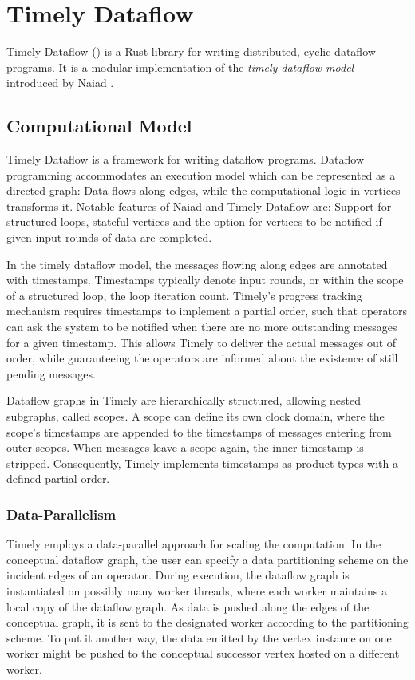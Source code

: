 \chapter{Timely Dataflow}\label{ch:background}

Timely Dataflow \cite{timely} () is a Rust library for writing distributed,
cyclic dataflow programs. It is a modular implementation of the \emph{timely dataflow
model} introduced by Naiad \cite{naiad}. 

\section{Computational Model}
\begin{addedbar}
Timely Dataflow is a framework for writing dataflow programs. Dataflow programming
accommodates an execution model which can be represented as a directed graph:
Data flows along edges, while the computational logic in vertices transforms it.
Notable features of Naiad and Timely Dataflow are: Support for structured loops,
stateful vertices and the option for vertices to be notified if given input
rounds of data are completed. \cite{naiad}

In the timely dataflow model, the messages flowing along edges are annotated with
timestamps. Timestamps typically denote input rounds, or within the scope of a
structured loop, the loop iteration count. Timely's progress tracking mechanism requires
timestamps to implement a partial order, such that operators can ask the system
to be notified when there are no more outstanding messages for a given timestamp.
This allows Timely to deliver the actual messages out of order, while 
guaranteeing the operators are informed about the existence of still pending
messages.

Dataflow graphs in Timely are hierarchically structured, allowing
nested subgraphs, called scopes. A scope can define its own clock
domain, where the scope's timestamps are appended to the timestamps of messages
entering from outer scopes. When messages leave a scope again, the inner 
timestamp is stripped. Consequently, Timely implements timestamps
as product types with a defined partial order.

\subsection{Data-Parallelism}

Timely employs a data-parallel approach for scaling the computation. In the
conceptual dataflow graph, the user can specify a data partitioning scheme
on the incident edges of an operator. During execution, the dataflow graph
is instantiated on possibly many worker threads, where each worker maintains
a local copy of the dataflow graph. As data is pushed along the edges of the
conceptual graph, it is sent to the designated worker according to the
partitioning scheme. To put it another way, the data emitted by the vertex
instance on one worker might be pushed to the conceptual successor vertex
hosted on a different worker.


\end{addedbar}
